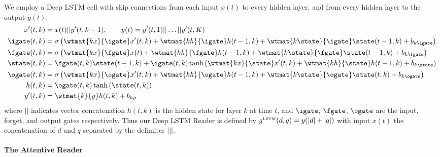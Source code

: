 We employ a Deep LSTM cell with skip connections from each input $x(t)$ to every
hidden layer, and from every hidden layer to the output $y(t)$:
\begin{align*}
  x'(t,k) &= x(t)||y'(t,k-1), \quad\quad y(t) = y'(t,1) || \ldots || y'(t,K) \\
  \igate(t,k) &= \sigma\left(\wtmat{kx}{\igate} x'(t,k) + \wtmat{kh}{\igate} h(t-1,k) + \wtmat{k\state}{\igate} \state(t-1,k)  + b_{k\igate}\right)\\
  \fgate(t,k) &= \sigma\left(\wtmat{kx}{\fgate} x(t) + \wtmat{kh}{\fgate} h(t-1,k) + \wtmat{k\state}{\fgate} \state(t-1,k) + b_{k\fgate} \right)\\
  \state(t,k) &= \fgate(t,k) \state(t-1,k) + \igate(t,k) \tanh \left(\wtmat{kx}{\state} x'(t,k) + \wtmat{kh}{\state} h(t-1,k) + b_{k\state} \right) \\
  \ogate(t,k) &= \sigma\left(\wtmat{kx}{\ogate} x'(t,k) + \wtmat{kh}{\ogate} h(t-1,k) + \wtmat{k\state}{\ogate} \state(t,k) + b_{k\ogate}\right)\\
  h(t,k) &= \ogate(t,k) \tanh\left(\state(t,k)\right)\\
  y'(t,k) &= \wtmat{k}{y}h(t,k) + b_{ky}
\end{align*}
where $||$ indicates vector concatenation $h(t,k)$ is the hidden state for layer
$k$ at time $t$, and $\igate$, $\fgate$, $\ogate$ are the input, forget, and
output gates respectively.
Thus our Deep LSTM Reader is defined by $g^{\text{\tiny LSTM}}(d,q) = y(|d|+|q|)$ with input $x(t)$ the concatenation of $d$ and $q$ separated by the delimiter $|||$.

\paragraph{The Attentive Reader}

\newcommand{\attnIn}{m}
\newcommand{\attnU}{u}
\newcommand{\attnOver}{y}
\newcommand{\attnMix}{r}
\newcommand{\attnMid}{z}
\newcommand{\attnScore}{s}
\newcommand{\fwd}[1]{\overrightarrow{#1}}
\newcommand{\back}[1]{\overleftarrow{#1}}
\newcommand{\softmax}[2]{\frac{\exp\left(#1\right)}{#2}}

